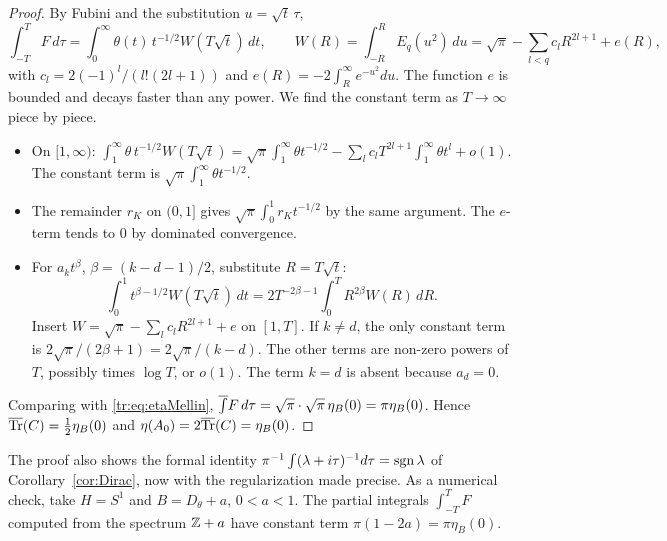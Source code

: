\begin{proof}
By Fubini and the substitution \(u=\sqrt t\,\tau\),
\[
 \int_{-T}^TF\,d\tau=\int_0^\infty\theta(t)\,t^{-1/2}W(T\sqrt t)\,dt,
 \qquad W(R)=\int_{-R}^RE_q(u^2)\,du=\sqrt\pi-\sum_{l<q}c_lR^{2l+1}+e(R),
\]
with \(c_l=2(-1)^l/(l!(2l+1))\) and \(e(R)=-2\int_R^\infty e^{-u^2}du\).
The function \(e\) is bounded and decays faster than any power. We find the
constant term as \(T\to\infty\) piece by piece.
\begin{itemize}
\item On \([1,\infty)\):
\(\int_1^\infty\theta\,t^{-1/2}W(T\sqrt t)=\sqrt\pi\int_1^\infty\theta
t^{-1/2}-\sum_lc_lT^{2l+1}\int_1^\infty\theta t^l+o(1)\). The constant term
is \(\sqrt\pi\int_1^\infty\theta t^{-1/2}\).
\item The remainder \(r_K\) on \((0,1]\) gives
\(\sqrt\pi\int_0^1r_Kt^{-1/2}\) by the same argument. The \(e\)-term tends
to \(0\) by dominated convergence.
\item For \(a_kt^\beta\), \(\beta=(k-d-1)/2\), substitute \(R=T\sqrt t\):
\[
 \int_0^1t^{\beta-1/2}W(T\sqrt t)\,dt=2T^{-2\beta-1}\int_0^TR^{2\beta}W(R)\,dR .
\]
Insert \(W=\sqrt\pi-\sum_lc_lR^{2l+1}+e\) on \([1,T]\). If \(k\ne d\), the
only constant term is \(2\sqrt\pi/(2\beta+1)=2\sqrt\pi/(k-d)\). The other
terms are non-zero powers of \(T\), possibly times \(\log T\), or
\(o(1)\). The term \(k=d\) is absent because \(a_d=0\).
\end{itemize}
Comparing with \eqref{tr:eq:etaMellin}, \(\overline{\int} F\,d\tau=\sqrt\pi\cdot
\sqrt\pi\,\eta_B(0)=\pi\eta_B(0)\). Hence \(\overline{\operatorname{Tr}}(C)=\frac12\eta_B(0)\) and
\(\eta(A_0)=2\overline{\operatorname{Tr}}(C)=\eta_B(0)\).
\end{proof}

The proof also shows the formal identity
\(\pi^{-1}\int(\lambda+i\tau)^{-1}d\tau=\operatorname{sgn}\lambda\) of
Corollary~\ref{cor:Dirac}, now with the regularization made precise. As a
numerical check, take \(H=S^1\) and \(B=D_\theta+a\), \(0<a<1\). The partial
integrals \(\int_{-T}^TF\) computed from the spectrum \(\mathbb Z+a\) have constant
term \(\pi(1-2a)=\pi\eta_B(0)\).

